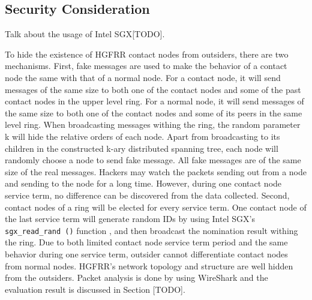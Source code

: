 \subsection{Security Consideration} \label{security}

Talk about the usage of Intel SGX[TODO].

To hide the existence of HGFRR contact nodes from outsiders, there are two mechanisms. First, fake messages are used to make the behavior of a contact node the same with that of a normal node. For a contact node, it will send messages of the same size to both one of the contact nodes and some of the past contact nodes in the upper level ring. For a normal node, it will send messages of the same size to both one of the contact nodes and some of its peers in the same level ring. When broadcasting messages withing the ring, the random parameter k will hide the relative orders of each node. Apart from broadcasting to its children in the constructed k-ary distributed spanning tree, each node will randomly choose a node to send fake message. All fake messages are of the same size of the real messages. Hackers may watch the packets sending out from a node and sending to the node for a long time. However, during one contact node service term, no difference can be discovered from the data collected. Second, contact nodes of a ring will be elected for every service term. One contact node of the last service term will generate random IDs by using Intel SGX's \texttt{sgx\_read\_rand ()} function \cite{costan2016intel}, and then broadcast the nomination result withing the ring. Due to both limited contact node service term period and the same behavior during one service term, outsider cannot differentiate contact nodes from normal nodes. HGFRR's network topology and structure are well hidden from the outsiders. Packet analysis is done by using WireShark and the evaluation result is discussed in Section [TODO].